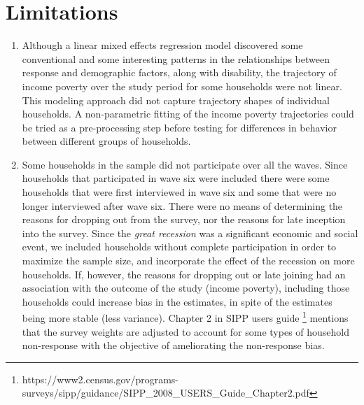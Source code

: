 \documentclass[11pt]{extarticle} %
\begin{document}

\section*{Limitations}
\begin{enumerate}
\item Although a linear mixed effects regression model discovered some conventional and some interesting patterns in the relationships between response and demographic factors, along with disability, the trajectory of income poverty over the study period for some households were not linear. This modeling approach did not capture trajectory shapes of individual households. A non-parametric fitting of the income poverty trajectories could be tried as a pre-processing step before testing for differences in behavior between different groups of households. 

\item Some households in the sample did not participate over all the waves. Since households that participated in wave six were included there were some households that were first interviewed in wave six and some that were no longer interviewed after wave six. There were no means of determining the reasons for dropping out from the survey, nor the reasons for late inception into the survey. Since the {\emph{great recession}} was a significant economic and social event, we included households without complete participation in order to maximize the sample size, and incorporate the effect of the recession on more households. If, however, the reasons for dropping out or late joining had an association with the outcome of the study (income poverty), including those households could increase bias in the estimates, in spite of the estimates being more stable (less variance). Chapter 2 in SIPP users guide \footnote{https://www2.census.gov/programs-surveys/sipp/guidance/SIPP\_2008\_USERS\_Guide\_Chapter2.pdf} mentions that the survey weights are adjusted to account for some types of household non-response with the objective of ameliorating the non-response bias. 
\end{enumerate}

\newpage



\newpage

\end{document}
